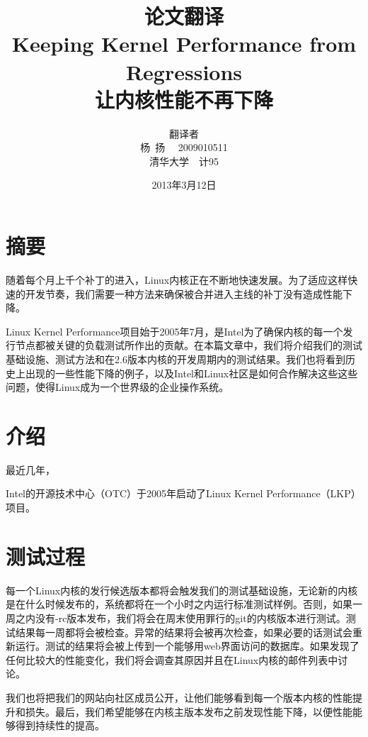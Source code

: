 \documentclass[CJK,12pt,a4paper]{article}
\begin{document}
\title{\large 论文翻译\\
\LARGE Keeping Kernel Performance from Regressions\\
让内核性能不再下降}
\author{翻译者\\杨\ 扬~~ 2009010511\\清华大学\ \ 计95 }
\date{2013年3月12日}
\maketitle


\pagestyle{fancy}

\section*{摘要}
随着每个月上千个补丁的进入，Linux内核正在不断地快速发展。为了适应这样快速的开发节奏，我们需要一种方法来确保被合并进入主线的补丁没有造成性能下降。

Linux Kernel Performance项目始于2005年7月，是Intel为了确保内核的每一个发行节点都被关键的负载测试所作出的贡献。在本篇文章中，我们将介绍我们的测试基础设施、测试方法和在2.6版本内核的开发周期内的测试结果。我们也将看到历史上出现的一些性能下降的例子，以及Intel和Linux社区是如何合作解决这些这些问题，使得Linux成为一个世界级的企业操作系统。
\section{介绍}
最近几年，


Intel的开源技术中心（OTC）于2005年启动了Linux Kernel Performance（LKP）项目。
\section{测试过程}
每一个Linux内核的发行候选版本都将会触发我们的测试基础设施，无论新的内核是在什么时候发布的，系统都将在一个小时之内运行标准测试样例。否则，如果一周之内没有-rc版本发布，我们将会在周末使用罪行的git的内核版本进行测试。测试结果每一周都将会被检查。异常的结果将会被再次检查，如果必要的话测试会重新运行。测试的结果将会被上传到一个能够用web界面访问的数据库。如果发现了任何比较大的性能变化，我们将会调查其原因并且在Linux内核的邮件列表中讨论。

我们也将把我们的网站向社区成员公开，让他们能够看到每一个版本内核的性能提升和损失。最后，我们希望能够在内核主版本发布之前发现性能下降，以便性能能够得到持续性的提高。
\end{document}
